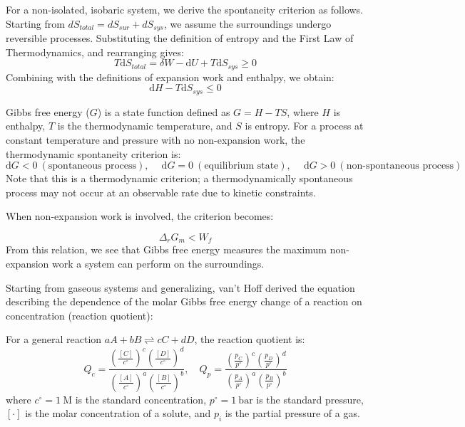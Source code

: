 For a non-isolated, isobaric system, we derive the spontaneity criterion as follows. Starting from $dS_{total} = dS_{sur} + dS_{sys}$, we assume the surroundings undergo reversible processes. Substituting the definition of entropy and the First Law of Thermodynamics, and rearranging gives:
$$T \mathrm{d}S_{total} = \delta W - \mathrm{d}U + T \mathrm{d}S_{sys} \geq 0 $$
Combining with the definitions of expansion work and enthalpy, we obtain:
$$\mathrm{d}H - T \mathrm{d}S_{sys} \leqslant 0 $$

\begin{definition}
Gibbs free energy ($G$) is a state function defined as $G = H - TS$, where $H$ is enthalpy, $T$ is the thermodynamic temperature, and $S$ is entropy. For a process at constant temperature and pressure with no non-expansion work, the thermodynamic spontaneity criterion is:
$$\mathrm{d}G < 0 \ (\text{spontaneous process}),\quad \ \mathrm{d}G = 0 \ (\text{equilibrium state}),\quad \ \mathrm{d}G > 0 \ (\text{non-spontaneous process})$$
Note that this is a thermodynamic criterion; a thermodynamically spontaneous process may not occur at an observable rate due to kinetic constraints.
\end{definition}

When non-expansion work is involved, the criterion becomes:

\begin{proposition}
$$\Delta_r G_m < W_f$$
From this relation, we see that Gibbs free energy measures the maximum non-expansion work a system can perform on the surroundings.
\end{proposition}

Starting from gaseous systems and generalizing, van't Hoff derived the equation describing the dependence of the molar Gibbs free energy change of a reaction on concentration (reaction quotient):

\begin{definition}
For a general reaction $aA + bB \rightleftharpoons cC + dD$, the reaction quotient is:
$$Q_c = \frac{\left(\frac{[C]}{c^\circ}\right)^c \left(\frac{[D]}{c^\circ}\right)^d}{\left(\frac{[A]}{c^\circ}\right)^a \left(\frac{[B]}{c^\circ}\right)^b},\quad Q_p = \frac{\left(\frac{p_C}{p^\circ}\right)^c \left(\frac{p_D}{p^\circ}\right)^d}{\left(\frac{p_A}{p^\circ}\right)^a \left(\frac{p_B}{p^\circ}\right)^b}$$
where $c^\circ = 1\ \mathrm{M}$ is the standard concentration, $p^\circ = 1\ \mathrm{bar}$ is the standard pressure, $[\cdot]$ is the molar concentration of a solute, and $p_i$ is the partial pressure of a gas.
\end{definition}

